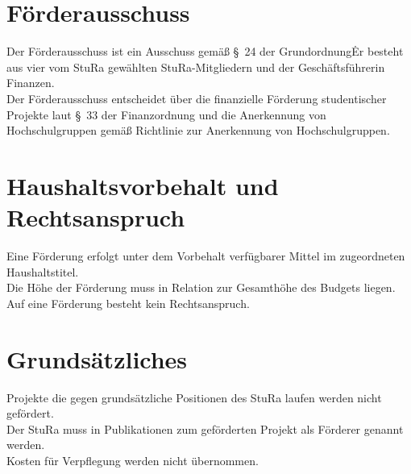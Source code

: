 \setcounter{section}{0} %
\setcounter{sentence}{0} %
\begin{multicols}{2}

\section{Förderausschuss}

\Abs \Satz Der Förderausschuss ist ein Ausschuss gemäß §~24 der Grundordnung\. Er besteht aus vier vom
StuRa gewählten StuRa-Mitgliedern und der Geschäftsführerin Finanzen.
\\ 

\Abs \Satz Der Förderausschuss entscheidet über die finanzielle Förderung studentischer Projekte laut §~33 der Finanzordnung und die Anerkennung von Hochschulgruppen gemäß Richtlinie zur Anerkennung von Hochschulgruppen.

\section{Haushaltsvorbehalt und Rechtsanspruch}
\Abs \Satz Eine Förderung erfolgt unter dem Vorbehalt verfügbarer Mittel im zugeordneten
Haushaltstitel.\\

\Abs \Satz Die Höhe der Förderung muss in Relation zur Gesamthöhe des Budgets liegen.\\

\Abs \Satz Auf eine Förderung besteht kein Rechtsanspruch.

\section{Grundsätzliches}
\Abs \Satz Projekte die gegen grundsätzliche Positionen des StuRa laufen werden nicht gefördert.\\

\Abs \Satz Der StuRa muss in Publikationen zum geförderten Projekt als Förderer genannt werden.\\

\Abs \Satz Kosten für Verpflegung werden nicht übernommen.\\


\end{multicols}
